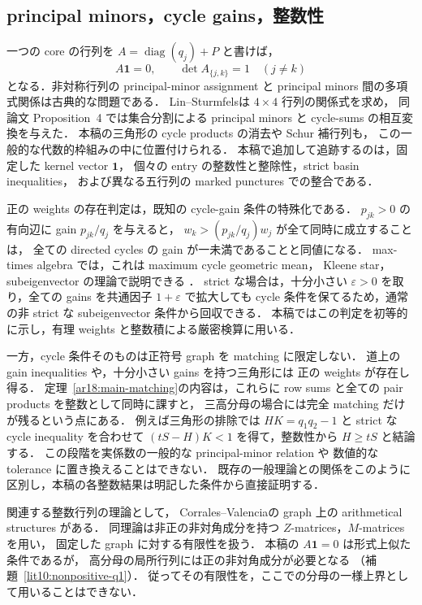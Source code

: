 \subsection{principal minors，cycle gains，整数性}

一つの core の行列を $A=\operatorname{diag}(q_j)+P$ と書けば，
\[
 A\mathbf1=0,\qquad \det A_{\{j,k\}}=1\quad(j\ne k)
\]
となる．非対称行列の principal-minor assignment と
principal minors 間の多項式関係は古典的な問題である．
Lin--Sturmfels\cite{LinSturmfels}は $4\times4$ 行列の関係式を求め，
同論文 Proposition~4 では集合分割による principal minors と cycle-sums の相互変換を与えた．
本稿の三角形の cycle products の消去や Schur 補行列も，
この一般的な代数的枠組みの中に位置付けられる．
本稿で追加して追跡するのは，固定した kernel vector $\mathbf1$，
個々の entry の整数性と整除性，strict basin inequalities，
および異なる五行列の marked punctures での整合である．

正の weights の存在判定は，既知の cycle-gain 条件の特殊化である．
$p_{jk}>0$ の有向辺に gain $p_{jk}/q_j$ を与えると，
$w_k>(p_{jk}/q_j)w_j$ が全て同時に成立することは，
全ての directed cycles の gain が一未満であることと同値になる．
max-times algebra では，これは maximum cycle geometric mean，
Kleene star，subeigenvector の理論で説明できる
\cite[\S2, Theorem~2.2 and Proposition~2.5]{SergeevSchneiderButkovic}．
strict な場合は，十分小さい $\varepsilon>0$ を取り，全ての gains を共通因子 $1+\varepsilon$ で拡大しても
cycle 条件を保てるため，通常の非 strict な subeigenvector 条件から回収できる．
本稿ではこの判定を初等的に示し，有理 weights と整数積による厳密検算に用いる．

一方，cycle 条件そのものは正符号 graph を matching に限定しない．
道上の gain inequalities や，十分小さい gains を持つ三角形には
正の weights が存在し得る．
定理~\ref{ar18:main-matching}の内容は，これらに
row sums と全ての pair products を整数として同時に課すと，
三高分母の場合には完全 matching だけが残るという点にある．
例えば三角形の排除では $HK=q_1q_2-1$ と strict な cycle inequality を合わせて
$(tS-H)K<1$ を得て，整数性から $H\ge tS$ と結論する．
この段階を実係数の一般的な principal-minor relation や
数値的な tolerance に置き換えることはできない．
既存の一般理論との関係をこのように区別し，本稿の各整数結果は明記した条件から直接証明する．

関連する整数行列の理論として，
Corrales--Valencia\cite[\S\S2--3]{CorralesValencia}の graph 上の arithmetical structures がある．
同理論は非正の非対角成分を持つ $Z$-matrices，$M$-matrices を用い，
固定した graph に対する有限性を扱う．
本稿の $A\mathbf1=0$ は形式上似た条件であるが，
高分母の局所行列には正の非対角成分が必要となる
（補題~\ref{lit10:nonpositive-q1}）．
従ってその有限性を，ここでの分母の一様上界として用いることはできない．


